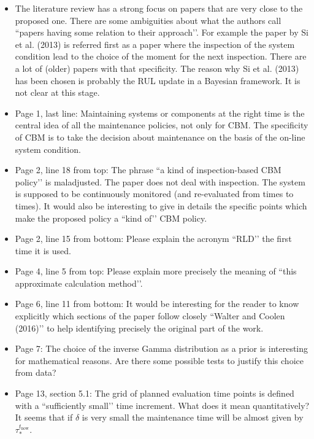 \documentclass[authoryear]{elsarticle}
\def\tnow{t_\text{now}}
\begin{document}
\begin{itemize}
\item The literature review has a strong focus on papers that are very close to the proposed one. There are some ambiguities about what the authors call ``papers having some relation to their approach’’. For example the paper by Si et al. (2013) is referred first as a paper where the inspection of the system condition lead to the choice of the moment for the next inspection. There are a lot of (older) papers with that specificity. The reason why Si et al. (2013) has been chosen is probably the RUL update in a Bayesian framework. It is not clear at this stage.

\item Page 1, last line: Maintaining systems or components at the right time is the central idea of all the maintenance policies, not only for CBM. The specificity of CBM is to take the decision about maintenance on the basis of the on-line system condition. 

\item Page 2, line 18 from top: The phrase ``a kind of inspection-based CBM policy’’ is maladjusted. The paper does not deal with inspection. The system is supposed to be continuously monitored (and re-evaluated from times to times). It would also be interesting to give in details the specific points which make the proposed policy a ``kind of’’ CBM policy.

\item Page 2, line 15 from bottom: Please explain the acronym ``RLD’’ the first time it is used. 

\item Page 4, line 5 from top: Please explain more precisely the meaning of ``this approximate calculation method’’.

\item Page 6, line 11 from bottom: It would be interesting for the reader to know explicitly which sections of the paper follow closely ``Walter and Coolen (2016)’’ to help identifying precisely the original part of the work. 

\item Page 7: The choice of the inverse Gamma distribution as a prior is interesting for mathematical reasons. Are there some possible tests to justify this choice from data?

\item Page 13, section 5.1: The grid of planned evaluation time points is defined with a ``sufficiently small’’ time increment. What does it mean quantitatively? It seems that if $\delta$ is very small the maintenance time will be almost given by $\tau_*^{\tnow}$.


\end{itemize}
\end{document}
